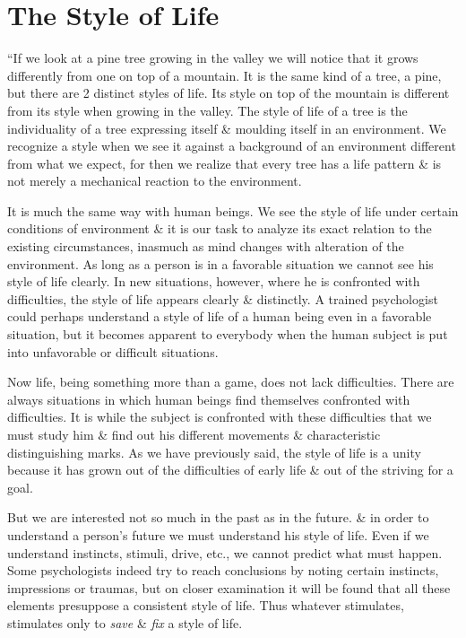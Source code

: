 \documentclass{article}
\numberwithin{equation}{section}
\begin{document}

\section{The Style of Life}
``If we look at a pine tree growing in the valley we will notice that it grows differently from one on top of a mountain. It is the same kind of a tree, a pine, but there are 2 distinct styles of life. Its style on top of the mountain is different from its style when growing in the valley. The style of life of a tree is the individuality of a tree expressing itself \& moulding itself in an environment. We recognize a style when we see it against a background of an environment different from what we expect, for then we realize that every tree has a life pattern \& is not merely a mechanical reaction to the environment.

It is much the same way with human beings. We see the style of life under certain conditions of environment \& it is our task to analyze its exact relation to the existing circumstances, inasmuch as mind changes with alteration of the environment. As long as a person is in a favorable situation we cannot see his style of life clearly. In new situations, however, where he is confronted with difficulties, the style of life appears clearly \& distinctly. A trained psychologist could perhaps understand a style of life of a human being even in a favorable situation, but it becomes apparent to everybody when the human subject is put into unfavorable or difficult situations.

Now life, being something more than a game, does not lack difficulties. There are always situations in which human beings find themselves confronted with difficulties. It is while the subject is confronted with these difficulties that we must study him \& find out his different movements \& characteristic distinguishing marks. As we have previously said, the style of life is a unity because it has grown out of the difficulties of early life \& out of the striving for a goal.

But we are interested not so much in the past as in the future. \& in order to understand a person's future we must understand his style of life. Even if we understand instincts, stimuli, drive, etc., we cannot predict what must happen. Some psychologists indeed try to reach conclusions by noting certain instincts, impressions or traumas, but on closer examination it will be found that all these elements presuppose a consistent style of life. Thus whatever stimulates, stimulates only to \textit{save} \& \textit{fix} a style of life.
\end{document}
